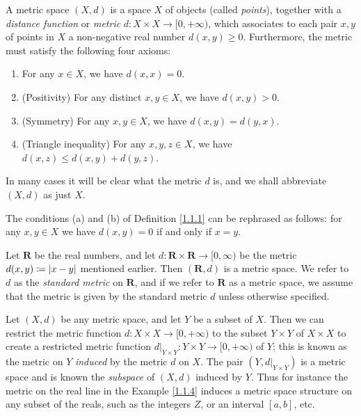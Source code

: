 \begin{definition}\label{1.1.2}
    A metric space \((X, d)\) is a space \(X\) of objects (called \emph{points}), together with a \emph{distance function} or \emph{metric} \(d : X \times X \to [0, +\infty)\), which associates to each pair \(x, y\) of points in \(X\) a non-negative real number \(d(x, y) \geq 0\).
    Furthermore, the metric must satisfy the following four axioms:
    \begin{enumerate}
        \item For any \(x \in X\), we have \(d(x, x) = 0\).
        \item (Positivity) For any distinct \(x, y \in X\), we have \(d(x, y) > 0\).
        \item (Symmetry) For any \(x, y \in X\), we have \(d(x, y) = d(y, x)\).
        \item (Triangle inequality) For any \(x, y, z \in X\), we have \(d(x, z) \leq d(x, y) + d(y, z)\).
    \end{enumerate}
\end{definition}

\begin{note}
    In many cases it will be clear what the metric \(d\) is, and we shall abbreviate \((X, d)\) as just \(X\).
\end{note}

\begin{remark}\label{1.1.3}
    The conditions (a) and (b) of Definition \ref{1.1.1} can be rephrased as follows:
    for any \(x, y \in X\) we have \(d(x, y) = 0\) if and only if \(x = y\).
\end{remark}

\begin{example}\label{1.1.4}
    Let \(\mathbf{R}\) be the real numbers, and let \(d : \mathbf{R} \times \mathbf{R} \to [0, \infty)\) be the metric \(d(x, y) \coloneqq \abs*{x - y}\) mentioned earlier.
    Then \((\mathbf{R}, d)\) is a metric space.
    We refer to \(d\) as the \emph{standard metric} on \(\mathbf{R}\), and if we refer to \(\mathbf{R}\) as a metric space, we assume that the metric is given by the standard metric \(d\) unless otherwise specified.
\end{example}

\begin{example}\label{1.1.5}
    Let \((X, d)\) be any metric space, and let \(Y\) be a subset of \(X\).
    Then we can restrict the metric function \(d : X \times X \to [0, +\infty)\) to the subset \(Y \times Y\) of \(X \times X\) to create a restricted metric function \(d|_{Y \times Y} : Y \times Y \to [0, +\infty)\) of \(Y\);
    this is known as the metric on \(Y\) \emph{induced} by the metric \(d\) on \(X\).
    The pair \((Y, d|_{Y \times Y})\) is a metric space and is known the \emph{subspace} of \((X, d)\) induced by \(Y\).
    Thus for instance the metric on the real line in the Example \ref{1.1.4} induces a metric space structure on any subset of the reals, such as the integers \(Z\), or an interval \([a, b]\), etc.
\end{example}

